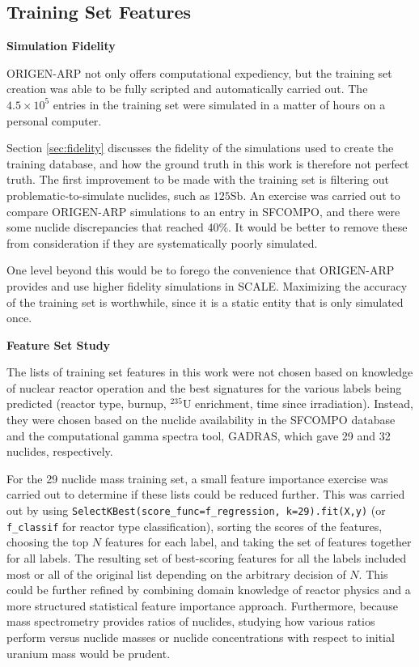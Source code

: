 \subsection{Training Set Features}

\noindent \textbf{Simulation Fidelity}

\gls{ORIGEN-ARP} not only offers computational expediency, but the training set
creation was able to be fully scripted and automatically carried out. The $4.5
\times 10^5$ entries in the training set were simulated in a matter of hours on
a personal computer.  

Section \ref{sec:fidelity} discusses the fidelity of the simulations used to
create the training database, and how the ground truth in this work is
therefore not perfect truth.  The first improvement to be made with the
training set is filtering out problematic-to-simulate nuclides, such as
${}{125}\text{Sb}$. An exercise was carried out to compare \gls{ORIGEN-ARP}
simulations to an entry in \gls{SFCOMPO}, and there were some nuclide
discrepancies that reached 40\%. It would be better to remove these from
consideration if they are systematically poorly simulated.

One level beyond this would be to forego the convenience that \gls{ORIGEN-ARP}
provides and use higher fidelity simulations in \gls{SCALE}.  Maximizing the
accuracy of the training set is worthwhile, since it is a static entity that is
only simulated once. 

\noindent \textbf{Feature Set Study}

The lists of training set features in this work were not chosen based on
knowledge of nuclear reactor operation and the best signatures for the various
labels being predicted (reactor type, burnup, ${}^{235}\text{U}$ enrichment,
time since irradiation).  Instead, they were chosen based on the nuclide
availability in the \gls{SFCOMPO} database and the computational gamma spectra
tool, \gls{GADRAS}, which gave 29 and 32 nuclides, respectively. 

For the 29 nuclide mass training set, a small feature importance exercise was
carried out to determine if these lists could be reduced further. This was
carried out by using \texttt{SelectKBest(score\_func=f\_regression,
k=29).fit(X,y)} (or \texttt{f\_classif} for reactor type classification),
sorting the scores of the features, choosing the top $N$ features for each
label, and taking the set of features together for all labels.  The resulting
set of best-scoring features for all the labels included most or all of the
original list depending on the arbitrary decision of $N$.  This could be
further refined by combining domain knowledge of reactor physics and a more
structured statistical feature importance approach. Furthermore, because mass
spectrometry provides ratios of nuclides, studying how various ratios perform
versus nuclide masses or nuclide concentrations with respect to initial uranium
mass would be prudent. 

